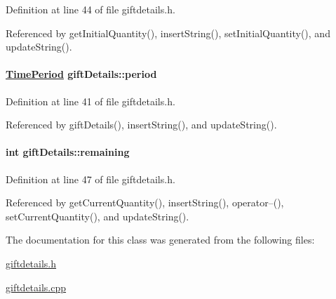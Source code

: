 Definition at line 44 of file giftdetails.h.

Referenced by get\-Initial\-Quantity(), insert\-String(), set\-Initial\-Quantity(), and update\-String().\hypertarget{classgiftDetails_giftDetailso2}{
\paragraph[period]{\setlength{\rightskip}{0pt plus 5cm}\hyperlink{classTimePeriod}{Time\-Period} gift\-Details::period}\hfill}
\label{classgiftDetails_giftDetailso2}




Definition at line 41 of file giftdetails.h.

Referenced by gift\-Details(), insert\-String(), and update\-String().\hypertarget{classgiftDetails_giftDetailso4}{
\paragraph[remaining]{\setlength{\rightskip}{0pt plus 5cm}int gift\-Details::remaining}\hfill}
\label{classgiftDetails_giftDetailso4}




Definition at line 47 of file giftdetails.h.

Referenced by get\-Current\-Quantity(), insert\-String(), operator--(), set\-Current\-Quantity(), and update\-String().

The documentation for this class was generated from the following files:\begin{CompactItemize}
\item 
\hyperlink{giftdetails_8h}{giftdetails.h}\item 
\hyperlink{giftdetails_8cpp}{giftdetails.cpp}\end{CompactItemize}
